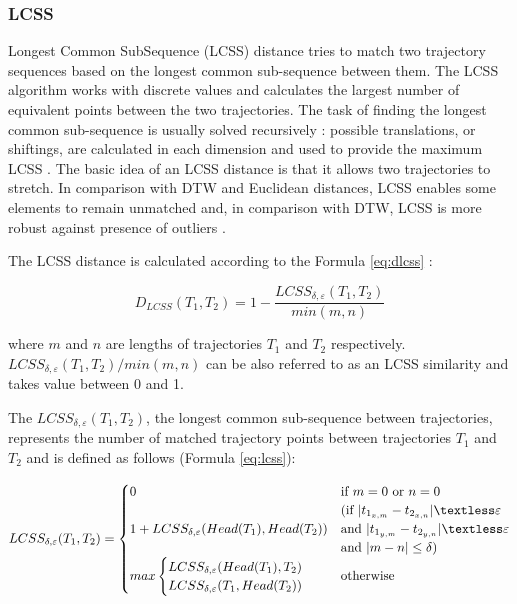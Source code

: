 \subsubsection{LCSS}

Longest Common SubSequence (LCSS) distance tries to match two trajectory sequences based on the longest common sub-sequence between them. The LCSS algorithm works with discrete values and calculates the largest number of equivalent points between the two trajectories. The task of finding the longest common sub-sequence is usually solved recursively \cite{article:8_review_mot_cl_alg}: possible translations, or shiftings, are calculated in each dimension and used to provide the maximum LCSS \cite{online:r_lcss}. The basic idea of an LCSS distance is that it allows two trajectories to stretch. In comparison with DTW and Euclidean distances, LCSS enables some elements to remain unmatched \cite{article:tr_sim_meas} and, in comparison with DTW, LCSS is more robust against presence of outliers \cite{article:ind_mult_ts}.

The LCSS distance is calculated according to the Formula \ref{eq:dlcss} \cite{inproceedings:7_related_work}:

\begin{equation} \label{eq:dlcss}
	D_{LCSS}(T_1, T_2) = 1 - \frac {LCSS_{\delta, \varepsilon}(T_1, T_2)} {min(m, n)}
\end{equation}

where $m$ and $n$ are lengths of trajectories $T_1$ and $T_2$ respectively. $LCSS_{\delta, \varepsilon}(T_1, T_2) / min(m, n)$ can be also referred to as an LCSS similarity and takes value between 0 and 1. 

The $LCSS_{\delta, \varepsilon}(T_1, T_2)$, the longest common sub-sequence between trajectories, represents the number of matched trajectory points between trajectories $T_1$ and $T_2$ and is defined as follows (Formula \ref{eq:lcss}):

\begin{equation} \label{eq:lcss}
	LCSS_{\delta, \varepsilon}(T_1, T_2) = 
		\begin{cases}
			0 			&\text{if $m = 0$ or $n = 0$}\\
						&\text{(if $|t_{1_{x,m}} - t_{2_{x,n}}| \textless \varepsilon$}\\
			1 + LCSS_{\delta, \varepsilon}(Head(T_1), Head(T_2)) 
						&\text{and $|t_{1_{y,m}} - t_{2_{y,n}}| \textless \varepsilon$}\\
						&\text{and $|m - n| \le \delta$)}\\
			max
			\begin{cases}
				LCSS_{\delta, \varepsilon}(Head(T_1), T_2)\\
				LCSS_{\delta, \varepsilon}(T_1, Head(T_2))
			\end{cases} &\text{otherwise}
		\end{cases}
\end{equation}


